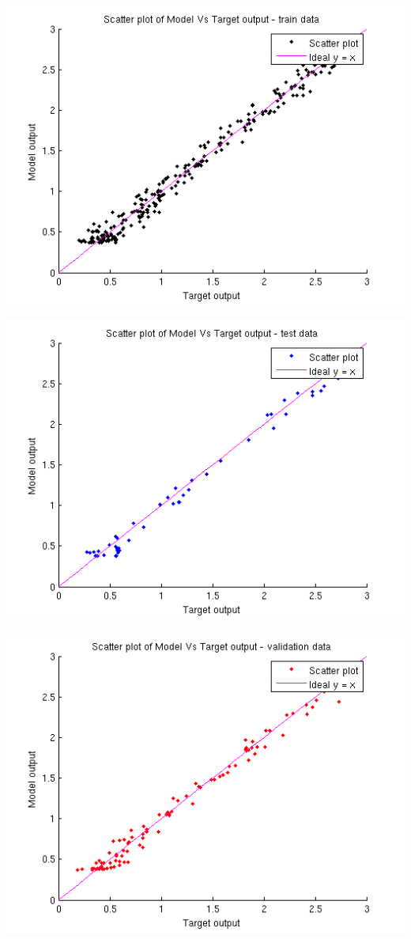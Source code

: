 \documentclass{article}
\begin{document}
\begin{center}
\includegraphics[scale=0.6]{Regression/nu/scatter_train}
\end{center}
\begin{center}
\includegraphics[scale=0.6]{Regression/nu/scatter_test}
\end{center}
\begin{center}
\includegraphics[scale=0.6]{Regression/nu/scatter_val}
\end{center}
\end{document}
